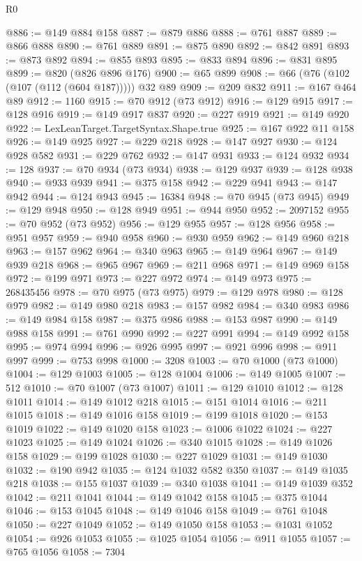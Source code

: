 \begin{lexlean}{R0}
\begin{coremodule}
@886 := @149 @884 @158
@887 := @879 @886
@888 := @761 @887
@889 := @866 @888
@890 := @761 @889
@891 := @875 @890
@892 := @842 @891
@893 := @873 @892
@894 := @855 @893
@895 := @833 @894
@896 := @831 @895
@899 := @820 (@826 @896 @176)
@900 := @65 @899
@908 := @66 (@76 (@102 (@107 (@112 (@604 @187))))) @32 @89
@909 := @209 @832
@911 := @167 @464 @89
@912 := 1160
@915 := @70 @912 (@73 @912)
@916 := @129 @915
@917 := @128 @916
@919 := @149 @917 @837
@920 := @227 @919
@921 := @149 @920
@922 := LexLeanTarget.TargetSyntax.Shape.true
@925 := @167 @922 @11 @158
@926 := @149 @925
@927 := @229 @218
@928 := @147 @927
@930 := @124 @928 @582
@931 := @229 @762
@932 := @147 @931
@933 := @124 @932
@934 := 128
@937 := @70 @934 (@73 @934)
@938 := @129 @937
@939 := @128 @938
@940 := @933 @939
@941 := @375 @158
@942 := @229 @941
@943 := @147 @942
@944 := @124 @943
@945 := 16384
@948 := @70 @945 (@73 @945)
@949 := @129 @948
@950 := @128 @949
@951 := @944 @950
@952 := 2097152
@955 := @70 @952 (@73 @952)
@956 := @129 @955
@957 := @128 @956
@958 := @951 @957
@959 := @940 @958
@960 := @930 @959
@962 := @149 @960 @218
@963 := @157 @962
@964 := @340 @963
@965 := @149 @964
@967 := @149 @939 @218
@968 := @965 @967
@969 := @211 @968
@971 := @149 @969 @158
@972 := @199 @971
@973 := @227 @972
@974 := @149 @973
@975 := 268435456
@978 := @70 @975 (@73 @975)
@979 := @129 @978
@980 := @128 @979
@982 := @149 @980 @218
@983 := @157 @982
@984 := @340 @983
@986 := @149 @984 @158
@987 := @375 @986
@988 := @153 @987
@990 := @149 @988 @158
@991 := @761 @990
@992 := @227 @991
@994 := @149 @992 @158
@995 := @974 @994
@996 := @926 @995
@997 := @921 @996
@998 := @911 @997
@999 := @753 @998
@1000 := 3208
@1003 := @70 @1000 (@73 @1000)
@1004 := @129 @1003
@1005 := @128 @1004
@1006 := @149 @1005
@1007 := 512
@1010 := @70 @1007 (@73 @1007)
@1011 := @129 @1010
@1012 := @128 @1011
@1014 := @149 @1012 @218
@1015 := @151 @1014
@1016 := @211 @1015
@1018 := @149 @1016 @158
@1019 := @199 @1018
@1020 := @153 @1019
@1022 := @149 @1020 @158
@1023 := @1006 @1022
@1024 := @227 @1023
@1025 := @149 @1024
@1026 := @340 @1015
@1028 := @149 @1026 @158
@1029 := @199 @1028
@1030 := @227 @1029
@1031 := @149 @1030
@1032 := @190 @942
@1035 := @124 @1032 @582 @350
@1037 := @149 @1035 @218
@1038 := @155 @1037
@1039 := @340 @1038
@1041 := @149 @1039 @352
@1042 := @211 @1041
@1044 := @149 @1042 @158
@1045 := @375 @1044
@1046 := @153 @1045
@1048 := @149 @1046 @158
@1049 := @761 @1048
@1050 := @227 @1049
@1052 := @149 @1050 @158
@1053 := @1031 @1052
@1054 := @926 @1053
@1055 := @1025 @1054
@1056 := @911 @1055
@1057 := @765 @1056
@1058 := 7304

\end{coremodule}
\end{lexlean}
